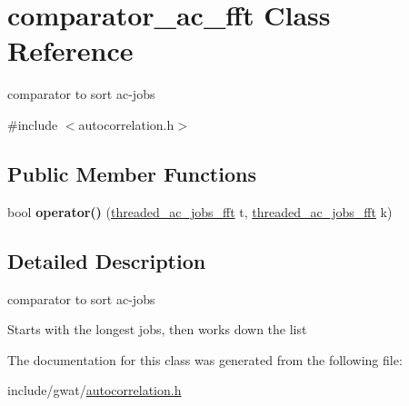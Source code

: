 \hypertarget{classcomparator__ac__fft}{}\section{comparator\+\_\+ac\+\_\+fft Class Reference}
\label{classcomparator__ac__fft}


comparator to sort ac-\/jobs  




{\ttfamily \#include $<$autocorrelation.\+h$>$}

\subsection*{Public Member Functions}
\begin{DoxyCompactItemize}
\item 
\mbox{\label{classcomparator__ac__fft_aec7693de9d131bcdf98019ca4f6c5fd5}} 
bool {\bfseries operator()} (\hyperlink{classthreaded__ac__jobs__fft}{threaded\+\_\+ac\+\_\+jobs\+\_\+fft} t, \hyperlink{classthreaded__ac__jobs__fft}{threaded\+\_\+ac\+\_\+jobs\+\_\+fft} k)
\end{DoxyCompactItemize}


\subsection{Detailed Description}
comparator to sort ac-\/jobs 

Starts with the longest jobs, then works down the list 

The documentation for this class was generated from the following file\+:\begin{DoxyCompactItemize}
\item 
include/gwat/\hyperlink{autocorrelation_8h}{autocorrelation.\+h}\end{DoxyCompactItemize}
